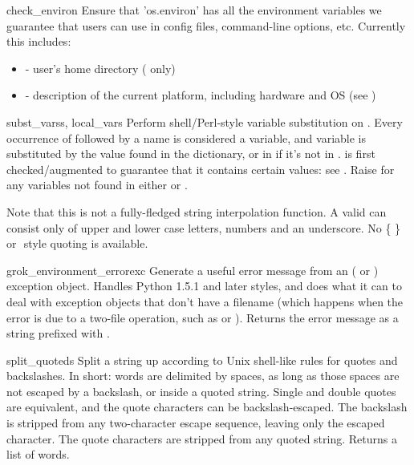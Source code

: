 \documentclass{manual}
\begin{document}
\begin{funcdesc}{check_environ}{}
Ensure that 'os.environ' has all the environment variables we
guarantee that users can use in config files, command-line options,
etc.  Currently this includes:
\begin{itemize}
\item {} - user's home directory (\UNIX{} only)
\item {} - description of the current platform, including
      hardware and OS (see )
\end{itemize}
\end{funcdesc}

\begin{funcdesc}{subst_vars}{s, local_vars}
Perform shell/Perl-style variable substitution on .  Every
occurrence of \code{\$} followed by a name is considered a variable, and
variable is substituted by the value found in the 
dictionary, or in  if it's not in .
 is first checked/augmented to guarantee that it contains
certain values: see .  Raise  
for any variables not found in either  or .

Note that this is not a fully-fledged string interpolation function. A
valid  can consist only of upper and lower case letters,
numbers and an underscore. No \{ \} or \( \) style quoting is available.
\end{funcdesc}

\begin{funcdesc}{grok_environment_error}{exc}
Generate a useful error message from an  
( or ) exception object.  
Handles Python 1.5.1 and later styles, and does what it can to deal with 
exception objects that don't have a filename (which happens when the error 
is due to a two-file operation, such as  or 
).  Returns the error message as a string prefixed 
with .
\end{funcdesc}

\begin{funcdesc}{split_quoted}{s}
Split a string up according to Unix shell-like rules for quotes and
backslashes.  In short: words are delimited by spaces, as long as those
spaces are not escaped by a backslash, or inside a quoted string.
Single and double quotes are equivalent, and the quote characters can
be backslash-escaped.  The backslash is stripped from any two-character
escape sequence, leaving only the escaped character.  The quote
characters are stripped from any quoted string.  Returns a list of
words.
\end{funcdesc}
\end{document}
